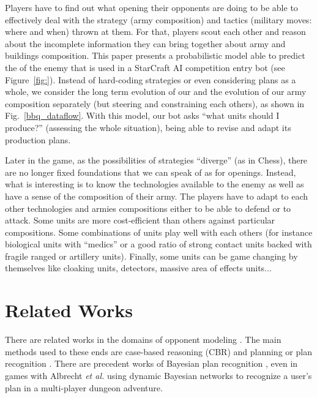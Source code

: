 Players have to find out what opening their opponents are doing to be able to effectively deal with the strategy (army composition) and tactics (military moves: where and when) thrown at them. For that, players scout each other and reason about the incomplete information they can bring together about army and buildings composition. This paper presents a probabilistic model able to predict the \textit{} of the enemy that is used in a StarCraft AI competition entry bot (see Figure~\ref{fig:}). Instead of hard-coding strategies or even considering plans as a whole, we consider the long term evolution of our  and the evolution of our army composition separately (but steering and constraining each others), as shown in Fig.~\ref{bbq_dataflow}. With this model, our bot asks ``what units should I produce?'' (assessing the whole situation), being able to revise and adapt its production plans.

Later in the game, as the possibilities of strategies ``diverge'' (as in Chess), there are no longer fixed foundations that we can speak of as for openings. Instead, what is interesting is to know the technologies available to the enemy as well as have a sense of the composition of their army. The players have to adapt to each other technologies and armies compositions either to be able to defend or to attack. Some units are more cost-efficient than others against particular compositions. Some combinations of units play well with each others (for instance biological units with ``medics'' or a good ratio of strong contact units backed with fragile ranged or artillery units). Finally, some units can be game changing by themselves like cloaking units, detectors, massive area of effects units... 


\section{Related Works}

\citep{Weber2010qf} 

There are related works in the domains of opponent modeling \citep{HsiehS08,schadd2007opponent,OBRecog}. The main methods used to these ends are case-based reasoning (CBR) and planning or plan recognition \citep{LTW,CBR_Planning,OntanonCBR,HTNPlanning,Ramirez}. There are precedent works of Bayesian plan recognition \citep{BMPR}, even in games with Albrecht \textit{et al.} \citep{BayesianRecog} using dynamic Bayesian networks to recognize a user's plan in a multi-player dungeon adventure. 

